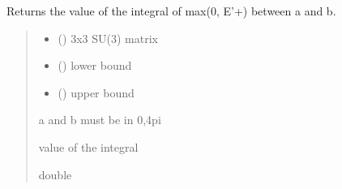 \documentclass[letterpaper,10pt,english]{sphinxmanual}
\begin{document}
\begin{fulllineitems}
\label{\detokenize{numerical_reject:numerical_reject.contrib}}
\pysigstartsignatures
\pysiglinewithargsret
{}
{\sphinxparamcomma {}\sphinxparamcomma {}}
{}
\pysigstopsignatures
\sphinxAtStartPar
Returns the value of the integral of max(0, E’+) between a and b.
\begin{quote}\begin{description}
\begin{itemize}
\item {} 
\sphinxAtStartPar
{} () \textendash{} 3x3 SU(3) matrix

\item {} 
\sphinxAtStartPar
{} () \textendash{} lower bound

\item {} 
\sphinxAtStartPar
{} () \textendash{} upper bound

\end{itemize}

\sphinxAtStartPar
{} \textendash{} a and b must be in 0,4pi

\sphinxAtStartPar
value of the integral

\sphinxAtStartPar
double

\end{description}\end{quote}

\end{fulllineitems}

\end{document}
